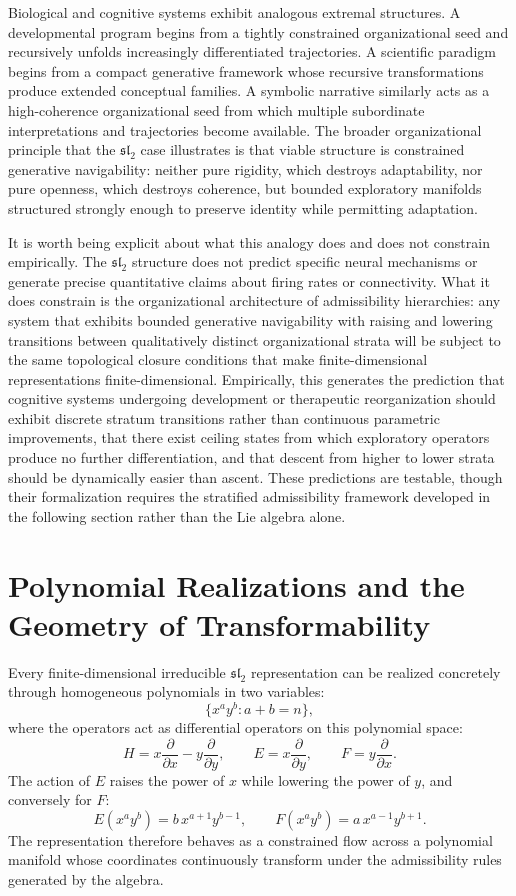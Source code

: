 \documentclass[12pt,a4paper]{report}
\theoremstyle{flyxion}
\begin{document}
Biological and cognitive systems exhibit analogous extremal structures. A developmental program begins from a tightly constrained organizational seed and recursively unfolds increasingly differentiated trajectories. A scientific paradigm begins from a compact generative framework whose recursive transformations produce extended conceptual families. A symbolic narrative similarly acts as a high-coherence organizational seed from which multiple subordinate interpretations and trajectories become available. The broader organizational principle that the $\mathfrak{sl}_2$ case illustrates is that viable structure is constrained generative navigability: neither pure rigidity, which destroys adaptability, nor pure openness, which destroys coherence, but bounded exploratory manifolds structured strongly enough to preserve identity while permitting adaptation.

It is worth being explicit about what this analogy does and does not constrain empirically. The $\mathfrak{sl}_2$ structure does not predict specific neural mechanisms or generate precise quantitative claims about firing rates or connectivity. What it does constrain is the organizational architecture of admissibility hierarchies: any system that exhibits bounded generative navigability with raising and lowering transitions between qualitatively distinct organizational strata will be subject to the same topological closure conditions that make finite-dimensional representations finite-dimensional. Empirically, this generates the prediction that cognitive systems undergoing development or therapeutic reorganization should exhibit discrete stratum transitions rather than continuous parametric improvements, that there exist ceiling states from which exploratory operators produce no further differentiation, and that descent from higher to lower strata should be dynamically easier than ascent. These predictions are testable, though their formalization requires the stratified admissibility framework developed in the following section rather than the Lie algebra alone.

\section{Polynomial Realizations and the Geometry of Transformability}

Every finite-dimensional irreducible $\mathfrak{sl}_2$ representation can be realized concretely through homogeneous polynomials in two variables:
\[
\{x^a y^b : a + b = n\},
\]
where the operators act as differential operators on this polynomial space:
\[
H = x\frac{\partial}{\partial x} - y\frac{\partial}{\partial y}, \qquad
E = x\frac{\partial}{\partial y}, \qquad
F = y\frac{\partial}{\partial x}.
\]
The action of $E$ raises the power of $x$ while lowering the power of $y$, and conversely for $F$:
\[
E(x^a y^b) = b\, x^{a+1} y^{b-1}, \qquad F(x^a y^b) = a\, x^{a-1} y^{b+1}.
\]
The representation therefore behaves as a constrained flow across a polynomial manifold whose coordinates continuously transform under the admissibility rules generated by the algebra.
\end{document}
